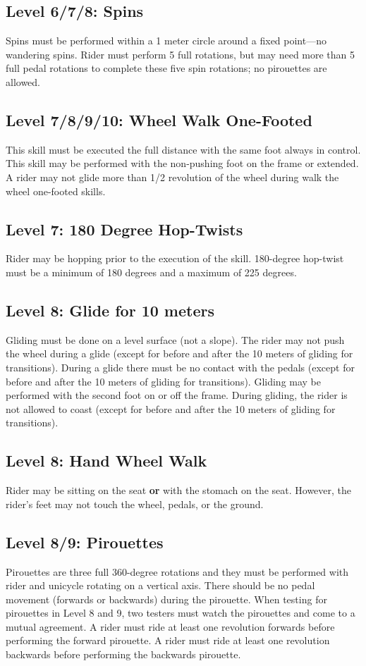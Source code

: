 \subsection{Level 6/7/8: Spins}
Spins must be performed within a 1 meter circle around a fixed point---no wandering spins.
Rider must perform 5 full rotations, but may need more than 5 full pedal rotations to complete these five spin rotations; no pirouettes are allowed.

\subsection{Level 7/8/9/10: Wheel Walk One-Footed}
This skill must be executed the full distance with the same foot always in control.
This skill may be performed with the non-pushing foot on the frame or extended.
A rider may not glide more than 1/2 revolution of the wheel during walk the wheel one-footed skills.

\subsection{Level 7: 180 Degree Hop-Twists}
Rider may be hopping prior to the execution of the skill.
180-degree hop-twist must be a minimum of 180 degrees and a maximum of 225 degrees.

\subsection{Level 8: Glide for 10 meters}
Gliding must be done on a level surface (not a slope).
The rider may not push the wheel during a glide (except for before and after the 10 meters of gliding for transitions).
During a glide there must be no contact with the pedals (except for before and after the 10 meters of gliding for transitions).
Gliding may be performed with the second foot on or off the frame.
During gliding, the rider is not allowed to coast (except for before and after the 10 meters of gliding for transitions).

\subsection{Level 8: Hand Wheel Walk}
Rider may be sitting on the seat \textbf{or} with the stomach on the seat.
However, the rider's feet may not touch the wheel, pedals, or the ground.

\subsection{Level 8/9: Pirouettes}
Pirouettes are three full 360-degree rotations and they must be performed with rider and unicycle rotating on a vertical axis.
There should be no pedal movement (forwards or backwards) during the pirouette.
When testing for pirouettes in Level 8 and 9, two testers must watch the pirouettes and come to a mutual agreement.
A rider must ride at least one revolution forwards before performing the forward pirouette.
A rider must ride at least one revolution backwards before performing the backwards pirouette.

